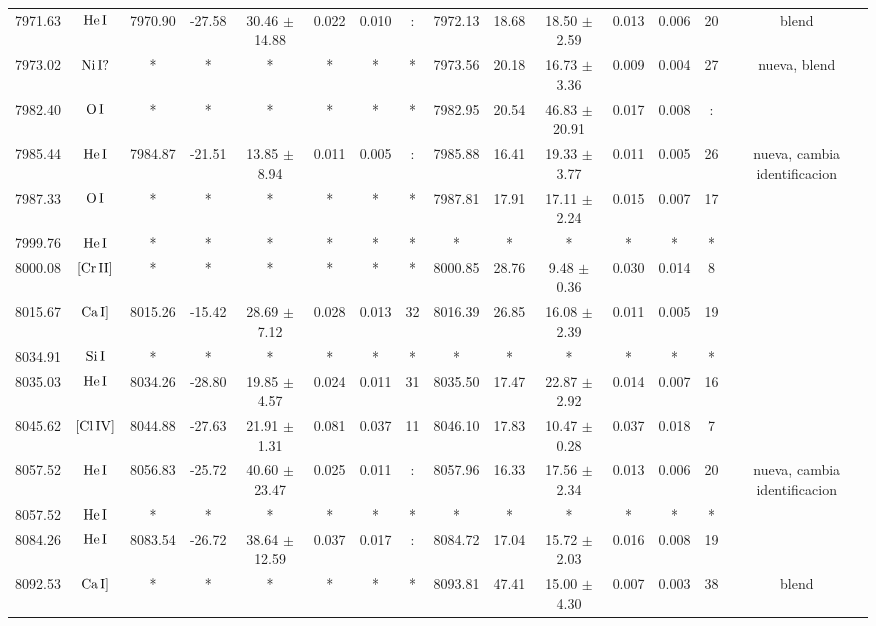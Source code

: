 \documentclass{article}
\begin{document}
\begin{table*}
\begin{adjustbox}{width=\textwidth}
\begin{tabular}{ccccccccccccccc}
7971.63 & $\mbox{He}\thinspace \mbox{I}$ & 7970.90 & -27.58 & 30.46 $\pm$ 14.88 & 0.022 & 0.010 & : & 7972.13 & 18.68 & 18.50 $\pm$ 2.59 & 0.013 & 0.006 & 20 &  blend \\
7973.02 & $\mbox{Ni}\thinspace \mbox{I?}$ & * & * & * & * & * & * & 7973.56 & 20.18 & 16.73 $\pm$ 3.36 & 0.009 & 0.004 & 27 &  nueva, blend \\
7982.40 & $\mbox{O}\thinspace \mbox{I}$ & * & * & * & * & * & * & 7982.95 & 20.54 & 46.83 $\pm$ 20.91 & 0.017 & 0.008 & : &  \\
7985.44 & $\mbox{He}\thinspace \mbox{I}$ & 7984.87 & -21.51 & 13.85 $\pm$ 8.94 & 0.011 & 0.005 & : & 7985.88 & 16.41 & 19.33 $\pm$ 3.77 & 0.011 & 0.005 & 26 &  nueva, cambia identificacion \\
7987.33 & $\mbox{O}\thinspace \mbox{I}$ & * & * & * & * & * & * & 7987.81 & 17.91 & 17.11 $\pm$ 2.24 & 0.015 & 0.007 & 17 &  \\
7999.76 & $\mbox{He}\thinspace \mbox{I}$ & * & * & * & * & * & * & * & * & * & * & * & * &  \\
8000.08 & $\mbox{[Cr}\thinspace \mbox{II]}$ & * & * & * & * & * & * & 8000.85 & 28.76 & 9.48 $\pm$ 0.36 & 0.030 & 0.014 & 8 &  \\
8015.67 & $\mbox{Ca}\thinspace \mbox{I]}$ & 8015.26 & -15.42 & 28.69 $\pm$ 7.12 & 0.028 & 0.013 & 32 & 8016.39 & 26.85 & 16.08 $\pm$ 2.39 & 0.011 & 0.005 & 19 &  \\
8034.91 & $\mbox{Si}\thinspace \mbox{I}$ & * & * & * & * & * & * & * & * & * & * & * & * &  \\
8035.03 & $\mbox{He}\thinspace \mbox{I}$ & 8034.26 & -28.80 & 19.85 $\pm$ 4.57 & 0.024 & 0.011 & 31 & 8035.50 & 17.47 & 22.87 $\pm$ 2.92 & 0.014 & 0.007 & 16 &  \\
8045.62 & $\mbox{[Cl}\thinspace \mbox{IV]}$ & 8044.88 & -27.63 & 21.91 $\pm$ 1.31 & 0.081 & 0.037 & 11 & 8046.10 & 17.83 & 10.47 $\pm$ 0.28 & 0.037 & 0.018 & 7 &  \\
8057.52 & $\mbox{He}\thinspace \mbox{I}$ & 8056.83 & -25.72 & 40.60 $\pm$ 23.47 & 0.025 & 0.011 & : & 8057.96 & 16.33 & 17.56 $\pm$ 2.34 & 0.013 & 0.006 & 20 &  nueva, cambia identificacion \\
8057.52 & $\mbox{He}\thinspace \mbox{I}$ & * & * & * & * & * & * & * & * & * & * & * & * &  \\
8084.26 & $\mbox{He}\thinspace \mbox{I}$ & 8083.54 & -26.72 & 38.64 $\pm$ 12.59 & 0.037 & 0.017 & : & 8084.72 & 17.04 & 15.72 $\pm$ 2.03 & 0.016 & 0.008 & 19 &  \\
8092.53 & $\mbox{Ca}\thinspace \mbox{I]}$ & * & * & * & * & * & * & 8093.81 & 47.41 & 15.00 $\pm$ 4.30 & 0.007 & 0.003 & 38 &  blend \\

\end{tabular}
\end{adjustbox}
\end{table*}
\end{document}
